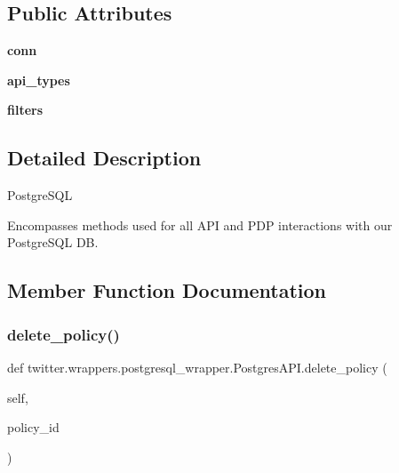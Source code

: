 \subsection*{Public Attributes}
\begin{DoxyCompactItemize}
\item 
\mbox{\label{classtwitter_1_1wrappers_1_1postgresql__wrapper_1_1PostgresAPI_afadde44f92f712763ef7d0aeaea2ef0f}} 
{\bfseries conn}
\item 
\mbox{\label{classtwitter_1_1wrappers_1_1postgresql__wrapper_1_1PostgresAPI_aed05e237c349e83bbcb76eccaf4f56df}} 
{\bfseries api\+\_\+types}
\item 
\mbox{\label{classtwitter_1_1wrappers_1_1postgresql__wrapper_1_1PostgresAPI_ad5c56fa3b0421230409f1a4268fcfa26}} 
{\bfseries filters}
\end{DoxyCompactItemize}


\subsection{Detailed Description}
\begin{DoxyVerb}PostgreSQL

Encompasses methods used for all API and PDP interactions with our PostgreSQL DB.
\end{DoxyVerb}
 

\subsection{Member Function Documentation}
\mbox{\label{classtwitter_1_1wrappers_1_1postgresql__wrapper_1_1PostgresAPI_a93b51196b75f21a7061a027a0b530bf0}} 
\subsubsection{\texorpdfstring{delete\+\_\+policy()}{delete\_policy()}}
{\footnotesize\ttfamily def twitter.\+wrappers.\+postgresql\+\_\+wrapper.\+Postgres\+A\+P\+I.\+delete\+\_\+policy (\begin{DoxyParamCaption}\item[{}]{self,  }\item[{}]{policy\+\_\+id }\end{DoxyParamCaption})}

